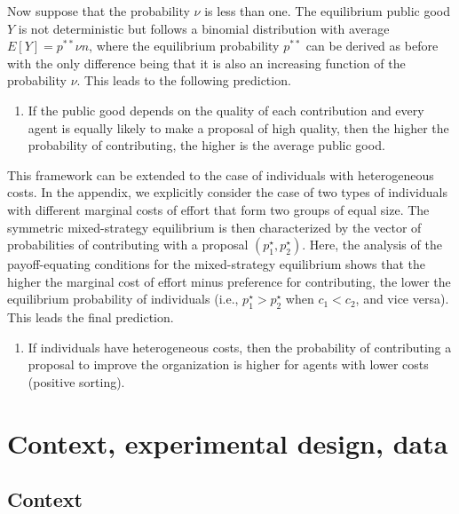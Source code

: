 \documentclass[11pt]{article}
\providecommand{\tightlist}{%
  \setlength{\itemsep}{0pt}\setlength{\parskip}{0pt}}
\begin{document}
Now suppose that the probability \(\nu\) is less than one. The
equilibrium public good \(Y\) is not deterministic but follows a
binomial distribution with average \(E[Y] = p^{**}\nu n\), where the
equilibrium probability \(p^{**}\) can be derived as before with the
only difference being that it is also an increasing function of the
probability \(\nu\). This leads to the following prediction.

\begin{enumerate}
\def\labelenumi{\arabic{enumi})}
\setcounter{enumi}{3}
\tightlist
\item
  If the public good depends on the quality of each contribution and
  every agent is equally likely to make a proposal of high quality, then
  the higher the probability of contributing, the higher is the average
  public good.
\end{enumerate}

This framework can be extended to the case of individuals with
heterogeneous costs. In the appendix, we explicitly consider the case of
two types of individuals with different marginal costs of effort that
form two groups of equal size. The symmetric mixed-strategy equilibrium
is then characterized by the vector of probabilities of contributing
with a proposal \((p_1^\star, p_2^\star)\). Here, the analysis of the
payoff-equating conditions for the mixed-strategy equilibrium shows that
the higher the marginal cost of effort minus preference for
contributing, the lower the equilibrium probability of individuals
(i.e., \(p_1^\star > p_2^\star\) when \(c_1 < c_2\), and vice versa).
This leads the final prediction.

\begin{enumerate}
\def\labelenumi{\arabic{enumi})}
\setcounter{enumi}{4}
\tightlist
\item
  If individuals have heterogeneous costs, then the probability of
  contributing a proposal to improve the organization is higher for
  agents with lower costs (positive sorting).
\end{enumerate}

\section{Context, experimental design,
data}\label{context-experimental-design-data}

\subsection{Context}\label{context}
\end{document}
